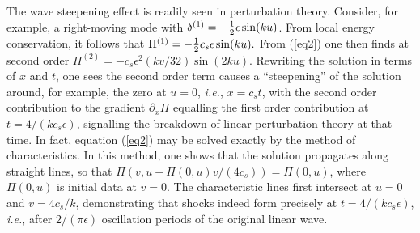 \documentclass[prl,aps,10pt,twocolumn,showkeys,nofootinbib]{revtex4-1}
\begin{document}
The wave steepening effect is readily seen in perturbation theory. Consider, for example, a right-moving mode with $\delta^{(1)}=-{1\over 2} \epsilon \sin (k u)$. From local energy conservation, it follows that $\Pi^{(1)}=-{1\over 2}  c_s \epsilon \sin (k u).$  From (\ref{eq2}) one then finds at second order $\Pi^{(2)}=-c_s \epsilon^2 (k v/32) \sin (2 k u)$. Rewriting the solution in terms of $x$ and $t$, one sees the second order term causes a ``steepening'' of the solution around, for example, the zero at $u=0$, {\it i.e.}, $x=c_s t$, with the second order contribution to the gradient $\partial_x \Pi$ equalling the first order contribution at $t=4/(k c_s \epsilon)$, signalling the breakdown of linear perturbation theory at that time. In fact, equation (\ref{eq2}) may be solved exactly by the method of characteristics. In this method, one shows that the solution propagates along straight lines, so that $\Pi(v,u+\Pi(0,u) v/(4 c_s))=\Pi(0,u)$, where $\Pi(0,u)$ is initial data at $v=0$. The characteristic lines first intersect at $u=0$ and $v=4 c_s/k$, demonstrating that shocks indeed form precisely at $t=4/(k c_s \epsilon)$, {\it i.e.}, after $2/(\pi \epsilon)$ oscillation periods of the original linear wave. 
\end{document}
